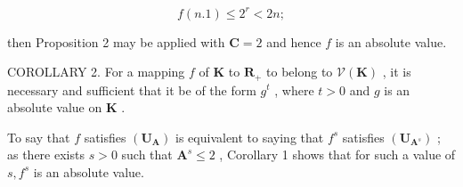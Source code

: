 \[
f (n. 1) \leqslant 2 ^ {r} <   2 n;
\]

then Proposition 2 may be applied with \(\mathbf{C} = 2\) and hence \(f\) is an absolute value.

COROLLARY 2. For a mapping \(f\) of \(\mathbf{K}\) to \(\mathbf{R}_+\) to belong to \(\mathcal{V}(\mathbf{K})\) , it is necessary and sufficient that it be of the form \(g^t\) , where \(t > 0\) and \(g\) is an absolute value on \(\mathbf{K}\) .

To say that \(f\) satisfies \((\mathbf{U}_{\mathbf{A}})\) is equivalent to saying that \(f^s\) satisfies \((\mathbf{U}_{\mathbf{A}^s})\) ; as there exists \(s > 0\) such that \(\mathbf{A}^s \leqslant 2\) , Corollary 1 shows that for such a value of \(s, f^s\) is an absolute value.

